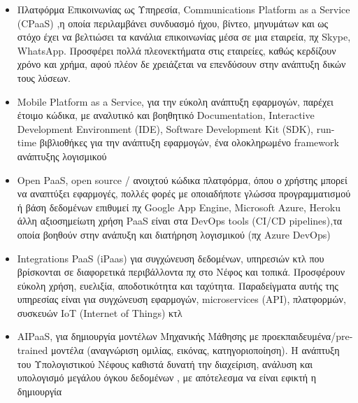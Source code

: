 \documentclass{article}
\begin{document}
\begin{itemize}
\item Πλατφόρμα Επικοινωνίας ως Υπηρεσία,
Communications Platform as a Service    (CPaaS)
,η οποία περιλαμβάνει συνδυασμό ήχου, βίντεο,
μηνυμάτων και ως στόχο έχει να βελτιώσει τα κανάλια επικοινωνίας μέσα σε
μια εταιρεία, πχ Skype, WhatsApp.
Προσφέρει πολλά πλεονεκτήματα στις εταιρείες, καθώς
κερδίζουν χρόνο και χρήμα, αφού πλέον δε χρειάζεται να επενδύσουν στην
ανάπτυξη δικών τους λύσεων.
\item {}Mobile Platform as a Service,
για την εύκολη ανάπτυξη εφαρμογών, παρέχει έτοιμο
κώδικα, με αναλυτικό και βοηθητικό Documentation,
Interactive Development Environment (IDE), Software Development Kit (SDK),
run-time βιβλιοθήκες για την ανάπτυξη εφαρμογών, ένα
ολοκληρωμένο framework
ανάπτυξης λογισμικού
\item Open PaaS, open source / ανοιχτού κώδικα
πλατφόρμα, όπου ο χρήστης μπορεί να αναπτύξει εφαρμογές, πολλές φορές με
οποιαδήποτε γλώσσα προγραμματισμού ή βάση δεδομένων επιθυμεί πχ
Google App Engine, Microsoft Azure,
Heroku
 άλλη αξιοσημείωτη χρήση  PaaS
είναι στα DevOps tools
(CI/CD pipelines),τα οποία βοηθούν στην ανάπυξη και
διατήρηση λογισμικού (πχ Azure DevOps)
\item Integrations PaaS (iPaas) για συγχώνευση
δεδομένων, υπηρεσιών κτλ που βρίσκονται σε διαφορετικά περιβάλλοντα πχ στο
Νέφος και τοπικά. Προσφέρουν εύκολη χρήση, ευελιξία, αποδοτικότητα και
ταχύτητα. Παραδείγματα αυτής της υπηρεσίας είναι για συγχώνευση εφαρμογών,
microservices (API),
πλατφορμών, συσκευών IoT (Internet of
Things) κτλ 
\item {}AIPaaS, για δημιουργία
μοντέλων Μηχανικής Μάθησης με
προεκπαιδευμένα/pre-trained
μοντέλα (αναγνώριση ομιλίας, εικόνας, κατηγοριοποίηση). Η ανάπτυξη του
Υπολογιστικού Νέφους καθιστά δυνατή την διαχείριση, ανάλυση και υπολογισμό
μεγάλου όγκου δεδομένων , με απότελεσμα να είναι εφικτή η δημιουργία

\end{itemize}
\end{document}
